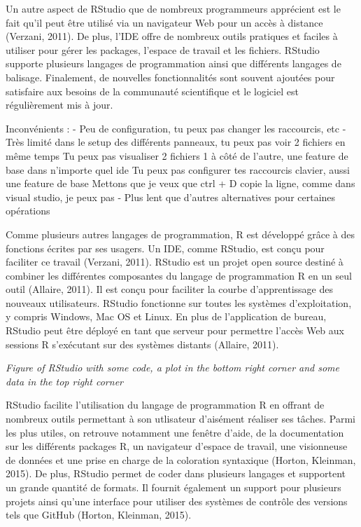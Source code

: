 \documentclass[
  letterpaper,
]{scrbook}
\begin{document}
Un autre aspect de RStudio que de nombreux programmeurs apprécient est
le fait qu'il peut être utilisé via un navigateur Web pour un accès à
distance (Verzani, 2011). De plus, l'IDE offre de nombreux outils
pratiques et faciles à utiliser pour gérer les packages, l'espace de
travail et les fichiers. RStudio supporte plusieurs langages de
programmation ainsi que différents langages de balisage. Finalement, de
nouvelles fonctionnalités sont souvent ajoutées pour satisfaire aux
besoins de la communauté scientifique et le logiciel est régulièrement
mis à jour.

Inconvénients : - Peu de configuration, tu peux pas changer les
raccourcis, etc - Très limité dans le setup des différents panneaux, tu
peux pas voir 2 fichiers en même temps Tu peux pas visualiser 2 fichiers
1 à côté de l'autre, une feature de base dans n'importe quel ide Tu peux
pas configurer tes raccourcis clavier, aussi une feature de base Mettons
que je veux que ctrl + D copie la ligne, comme dans visual studio, je
peux pas - Plus lent que d'autres alternatives pour certaines opérations

Comme plusieurs autres langages de programmation, R est développé grâce
à des fonctions écrites par ses usagers. Un IDE, comme RStudio, est
conçu pour faciliter ce travail (Verzani, 2011). RStudio est un projet
open source destiné à combiner les différentes composantes du langage de
programmation R en un seul outil (Allaire, 2011). Il est conçu pour
faciliter la courbe d'apprentissage des nouveaux utilisateurs. RStudio
fonctionne sur toutes les systèmes d'exploitation, y compris Windows,
Mac OS et Linux. En plus de l'application de bureau, RStudio peut être
déployé en tant que serveur pour permettre l'accès Web aux sessions R
s'exécutant sur des systèmes distants (Allaire, 2011).

\emph{Figure of RStudio with some code, a plot in the bottom right
corner and some data in the top right corner}

RStudio facilite l'utilisation du langage de programmation R en offrant
de nombreux outils permettant à son utlisateur d'aisément réaliser ses
tâches. Parmi les plus utiles, on retrouve notamment une fenêtre d'aide,
de la documentation sur les différents packages R, un navigateur
d'espace de travail, une visionneuse de données et une prise en charge
de la coloration syntaxique (Horton, Kleinman, 2015). De plus, RStudio
permet de coder dans plusieurs langages et supportent un grande quantité
de formats. Il fournit également un support pour plusieurs projets ainsi
qu'une interface pour utiliser des systèmes de contrôle des versions
tels que GitHub (Horton, Kleinman, 2015).
\end{document}

